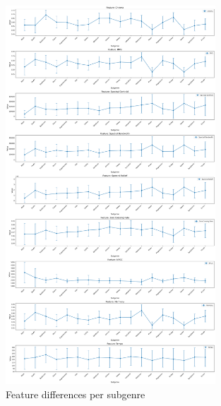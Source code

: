 \begin{figure}[ht!]
    \centering
    \includegraphics[width=0.7\textwidth]{figures/feature_differences_per_label.png} 
    \caption{Feature differences per subgenre}
    \label{fig:diff}
\end{figure}